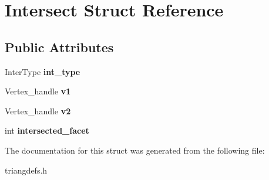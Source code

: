 \hypertarget{struct_intersect}{
\section{Intersect Struct Reference}
\label{struct_intersect}
}
\subsection*{Public Attributes}
\begin{DoxyCompactItemize}
\item 
\hypertarget{struct_intersect_a8255815733b4e1b3721b8bc29832bdbc}{
InterType {\bfseries int\_\-type}}
\label{struct_intersect_a8255815733b4e1b3721b8bc29832bdbc}

\item 
\hypertarget{struct_intersect_ac475cd53466b32a3b4a96611bb6be216}{
Vertex\_\-handle {\bfseries v1}}
\label{struct_intersect_ac475cd53466b32a3b4a96611bb6be216}

\item 
\hypertarget{struct_intersect_ae44020d73365a60da831bfa222703e4e}{
Vertex\_\-handle {\bfseries v2}}
\label{struct_intersect_ae44020d73365a60da831bfa222703e4e}

\item 
\hypertarget{struct_intersect_ae7d78402b79c68e9110144201a7403a6}{
int {\bfseries intersected\_\-facet}}
\label{struct_intersect_ae7d78402b79c68e9110144201a7403a6}

\end{DoxyCompactItemize}


The documentation for this struct was generated from the following file:\begin{DoxyCompactItemize}
\item 
triangdefs.h\end{DoxyCompactItemize}
